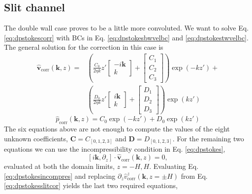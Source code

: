 \documentclass[twoside,openright,titlepage,numbers=noenddot,%
headinclude,footinclude,cleardoublepage=empty,abstract=on,
BCOR=5mm,fontsize=11pt, dvipsnames, paper=b5
]{scrreprt}
\renewcommand{\vec}[1]{\bm{#1}}
\newcommand{\fou}[1]{\widehat{#1}}
\newcommand{\fvel}{v}
\newcommand{\corr}{\text{corr}}
\begin{document}
\subsection*{Slit channel}
The double wall case proves to be a little more convoluted. We want to solve Eq. \eqref{eq:dpstokescorr} with \glspl{BC} in Eq. \eqref{eq:dpstokesbwvelbc} and \eqref{eq:dpstokestwvelbc}.
The general solution for the correction in this case is
\begin{equation}
  \label{eq:dpstokesslitcor}
  \begin{aligned}
    \fou{\vec{\fvel}}_{\corr}(\vec{k}, z) =& \left(\frac{C_0}{2\eta k} z'
      \begin{bmatrix}
        -i\vec{k}\\
        k
      \end{bmatrix}
      +
      \begin{bmatrix}
        C_1\\
        C_2\\
        C_3
      \end{bmatrix}
    \right)
    \exp(-kz')+\\    
    &\left(\frac{D_0}{2\eta k} z'
      \begin{bmatrix}
        i\vec{k}\\
        k
      \end{bmatrix}
      +
      \begin{bmatrix}
        D_1\\
        D_2\\
        D_3
      \end{bmatrix}
    \right)\exp(kz')
  \end{aligned}
\end{equation}
\begin{equation}
  \fou{p}_{\corr}(\vec{k}, z) = C_0\exp(-k z') + D_0\exp(k z')
\end{equation}
The six equations above are not enough to compute the values of the eight unknown coefficients, $\vec{C}=C_{[0,1,2,3]}$ and $\vec{D} = D_{[0,1,2,3]}$. For the remaining two equations we can use the incompressibility condition in Eq. \eqref{eq:dpstokes},
\begin{equation}
  \label{eq:dpstokesincompres}
  [i\vec{k}, \partial_z] \cdot\fou{\vec{\fvel}}_{\corr}(\vec{k}, z) = 0,
\end{equation}
evaluated at both the domain limits, $z=-H,H$.
Evaluating Eq. \eqref{eq:dpstokesincompres} and replacing $\partial_z\fou{\fvel}_{\corr}^z(\vec{k}, z=\pm H)$ from Eq. \eqref{eq:dpstokesslitcor} yields the last two required equations,
\end{document}
